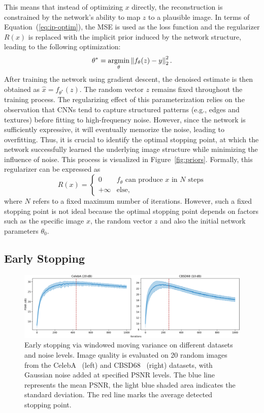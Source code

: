 This means that instead of optimizing $x$ directly, the reconstruction is constrained by the network's ability to map $z$ to a plausible image.
In terms of Equation~(\ref{eq:ip-optim}), the MSE is used as the loss function and the regularizer $R(x)$ is replaced with the implicit prior induced by the network structure, leading to the following optimization:
\begin{equation}
    \theta^* = \operatorname*{argmin}_\theta \left\lVert f_\theta(z) - y\right\rVert_2^2.
\end{equation}
After training the network using gradient descent, the denoised estimate is then obtained as $\hat{x} = f_{\theta^*}(z)$.
The random vector $z$ remains fixed throughout the training process.
The regularizing effect of this parameterization relies on the observation that CNNs tend to capture structured patterns (e.g., edges and textures) before fitting to high-frequency noise.
However, since the network is sufficiently expressive, it will eventually memorize the noise, leading to overfitting.
Thus, it is crucial to identify the optimal stopping point, at which the network successfully learned the underlying image structure while minimizing the influence of noise.
This process is visualized in Figure~\ref{fig:priors}.
Formally, this regularizer can be expressed as
\begin{equation}
    R(x) = \begin{cases}
        0 &\text{$f_\theta$ can produce $x$ in $N$ steps}\\
        +\infty &\text{else},
    \end{cases}
\end{equation}
where $N$ refers to a fixed maximum number of iterations.
However, such a fixed stopping point is not ideal because the optimal stopping point depends on factors such as the specific image $x$, the random vector $z$ and also the initial network parameters $\theta_0$.

\subsection{Early Stopping}

\begin{figure}[t]
    \centering
    \includegraphics[width=\textwidth]{img/fig_4.2.png}
    \caption{
        Early stopping via windowed moving variance on different datasets and noise levels.
        Image quality is evaluated on 20 random images from the CelebA~\cite{CelebA} (left) and CBSD68~\cite{CBSD68} (right) datasets, with Gaussian noise added at specified PSNR levels.
        The blue line represents the mean PSNR, the light blue shaded area indicates the standard deviation.
        The red line marks the average detected stopping point.
    }\label{fig:early-stopping}
\end{figure}

